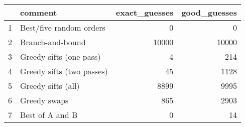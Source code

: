 \begin{table}[ht]
\centering
\begin{tabular}{rlrr}
  \hline
 & comment & exact\_guesses & good\_guesses \\ 
  \hline
1 & Best/five random orders &   0 &   0 \\ 
  2 & Branch-and-bound & 10000 & 10000 \\ 
  3 & Greedy sifts (one pass) &   4 & 214 \\ 
  4 & Greedy sifts (two passes) &  45 & 1128 \\ 
  5 & Greedy sifts (all) & 8899 & 9995 \\ 
  6 & Greedy swaps & 865 & 2903 \\ 
  7 & Best of A and B &   0 &  14 \\ 
   \hline
\end{tabular}
\end{table}
